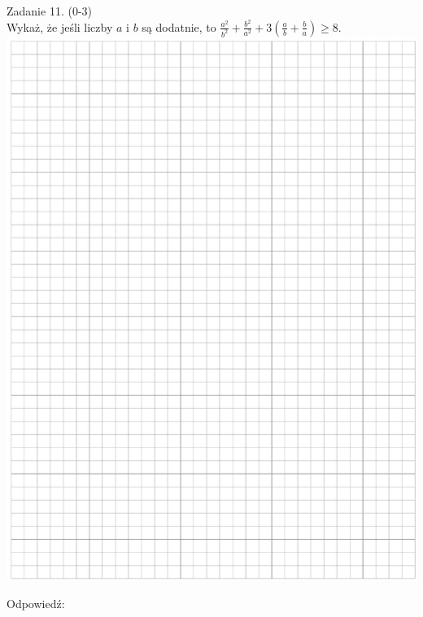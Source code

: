 \documentclass[10pt]{article}
\begin{document}
Zadanie 11. (0-3)\\
Wykaż, że jeśli liczby \(a\) i \(b\) są dodatnie, to \(\frac{a^{2}}{b^{2}}+\frac{b^{2}}{a^{2}}+3\left(\frac{a}{b}+\frac{b}{a}\right) \geq 8\).\\
\includegraphics[max width=\textwidth, center]{2024_11_21_c0ca116654784d42326bg-08}

Odpowiedź:
\end{document}
